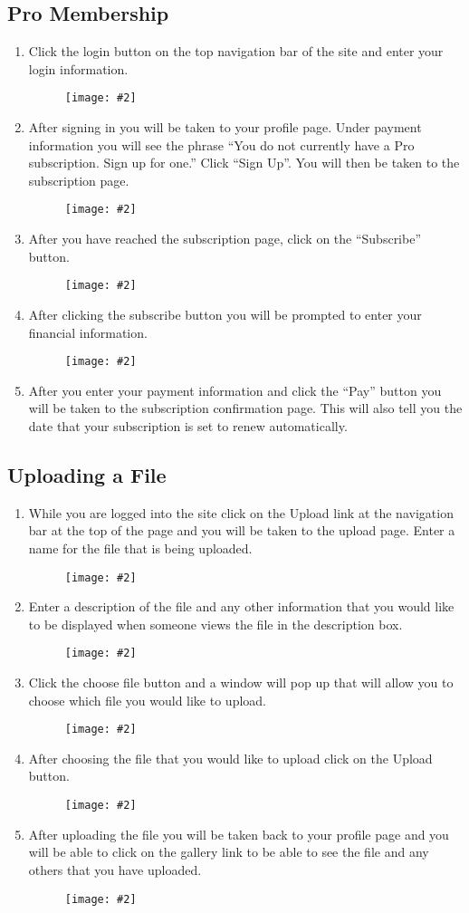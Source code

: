 \documentclass[11pt]{article}
\newcommand{\image}[2][]{
    \begin{figure}[!htbp]\centering\texttt{[image: \#2]}\end{figure}
}
\begin{document}
		\subsection{Pro Membership}
			\begin{enumerate}
				\item Click the login button on the top navigation bar of the site and enter your login information. \image{images/Pro 1.jpg}
				\item After signing in you will be taken to your profile page. Under payment information you will see the phrase ``You do not currently have a Pro subscription. Sign up for one.'' Click ``Sign Up''. You will then be taken to the subscription page. \image{images/Pro 2.png}
				\item After you have reached the subscription page, click on the ``Subscribe'' button. \image{images/Pro 3.jpg}
				\item After clicking the subscribe button you will be prompted to enter your financial information. \image{images/Pro 4.jpg}
				\item After you enter your payment information and click the ``Pay'' button you will be taken to the subscription confirmation page. This will also tell you the date that your subscription is set to renew automatically.
			\end{enumerate}
		
		\subsection{Uploading a File}
			\begin{enumerate}
				\item While you are logged into the site click on the Upload link at the navigation bar at the top of the page and you will be taken to the upload page. Enter a name for the file that is being uploaded. \image{images/Upload 1.png}
				\item Enter a description of the file and any other information that you would like to be displayed when someone views the file in the description box. \image{images/Upload 2.jpg}
				\item Click the choose file button and a window will pop up that will allow you to choose which file you would like to upload. \image{images/Upload 3.jpg}
				\item After choosing the file that you would like to upload click on the Upload button. \image{images/Upload 4.jpg}
				\item After uploading the file you will be taken back to your profile page and you will be able to click on the gallery link to be able to see the file and any others that you have uploaded. \image{images/Upload 5.jpg}
			\end{enumerate}
			
\end{document}
